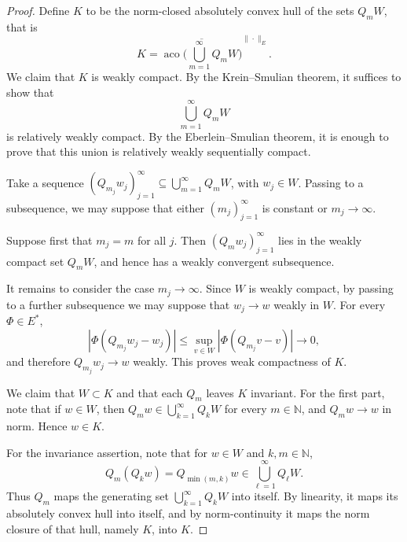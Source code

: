 \documentclass[11pt,reqno]{amsart}
\makeatletter
\theoremstyle{plain}
\theoremstyle{definition}
\newcounter{problempaper}
\newenvironment{problempaperbody}{%
  \setcounter{subsection}{0}%
  \setcounter{subsubsection}{0}%
  \setcounter{paragraph}{0}%
  \renewcommand{\thesubsection}{\arabic{subsection}}%
  \renewcommand{\thesubsubsection}{\thesubsection.\arabic{subsubsection}}%
  \renewcommand{\theparagraph}{\thesubsubsection.\arabic{paragraph}}%
  \let\problem@outersection\section
  \let\problem@outersubsection\subsection
  \let\problem@outersubsubsection\subsubsection
  \let\problem@outerparagraph\paragraph
  \let\section\problem@papersection
  \let\subsection\problem@papersubsection
  \let\subsubsection\problem@papersubsubsection
}{%
  \let\section\problem@outersection
  \let\subsection\problem@outersubsection
  \let\subsubsection\problem@outersubsubsection
  \let\paragraph\problem@outerparagraph
}
\newcommand{\problem@target}[2]{%
  \hypertarget{problem-\theproblempaper-#1-#2}{}%
}
\newcommand{\problem@paperheading}[3]{%
  \par\bigskip
  \problem@target{#1}{#2}%
  \noindent{\large\bfseries #2.\quad #3\par}%
  \nobreak\smallskip
}
\newcommand{\problem@papersubheading}[3]{%
  \par\medskip
  \problem@target{#1}{#2}%
  \noindent{\normalsize\bfseries #2.\quad #3\par}%
  \nobreak\smallskip
}
\newcommand{\problem@papersubsubheading}[3]{%
  \par\smallskip
  \problem@target{#1}{#2}%
  \noindent{\normalsize\itshape #2.\quad #3.\ }%
}
\def\problem@papersection{%
  \@ifstar{\problem@papersectionstar}{\problem@papersectionnostar}%
}
\def\problem@papersectionstar#1{%
  \par\bigskip\noindent{\large\bfseries #1\par}\nobreak\smallskip
}
\def\problem@papersectionnostar#1{%
  \refstepcounter{subsection}%
  \setcounter{subsubsection}{0}%
  \setcounter{paragraph}{0}%
  \problem@paperheading{section}{\thesubsection}{#1}%
  \problem@writecontentsline{section}{\thesubsection}{#1}%
}
\def\problem@papersubsection{%
  \@ifstar{\problem@papersubsectionstar}{\problem@papersubsectionnostar}%
}
\def\problem@papersubsectionstar#1{%
  \par\medskip\noindent{\normalsize\bfseries #1\par}\nobreak\smallskip
}
\def\problem@papersubsectionnostar#1{%
  \refstepcounter{subsubsection}%
  \setcounter{paragraph}{0}%
  \problem@papersubheading{subsection}{\thesubsubsection}{#1}%
  \problem@writecontentsline{subsection}{\thesubsubsection}{#1}%
}
\def\problem@papersubsubsection{%
  \@ifstar{\problem@papersubsubsectionstar}{\problem@papersubsubsectionnostar}%
}
\def\problem@papersubsubsectionstar#1{%
  \par\smallskip\noindent{\normalsize\itshape #1.\ }%
}
\def\problem@papersubsubsectionnostar#1{%
  \refstepcounter{paragraph}%
  \problem@papersubsubheading{subsubsection}{\theparagraph}{#1}%
  \problem@writecontentsline{subsubsection}{\theparagraph}{#1}%
}
\newcommand{\problem@writecontentsline}[3]{%
  \begingroup
  \protected@write\@auxout{}{%
    \string\problemcontentsentry{\theproblempaper}{#1}{#2}{#3}{\thepage}%
  }%
  \endgroup
}
\newcommand{\problemcontentsentry}[5]{%
  \@ifundefined{problemcontents@#1}{%
    \expandafter\gdef\csname problemcontents@#1\endcsname{}%
  }{}%
  \expandafter\g@addto@macro\csname problemcontents@#1\endcsname{%
    \problemcontentsline{#1}{#2}{#3}{#4}{#5}%
  }%
}
\newcommand{\problemcontentslink}[4]{%
  \hyperlink{problem-#1-#2-#3}{#4}%
}
\newcommand{\problemcontentsline}[5]{%
  \ifstrequal{#2}{section}{%
    \par\noindent
    \problemcontentslink{#1}{#2}{#3}{\makebox[2.5em][l]{#3}#4}%
    \nobreak\dotfill
    \problemcontentslink{#1}{#2}{#3}{#5}\par
  }{%
    \ifstrequal{#2}{subsection}{%
      \par\noindent\hspace*{1.5em}%
      \problemcontentslink{#1}{#2}{#3}{\makebox[3.5em][l]{#3}#4}%
      \nobreak\dotfill
      \problemcontentslink{#1}{#2}{#3}{#5}\par
    }{%
      \par\noindent\hspace*{3em}%
      \problemcontentslink{#1}{#2}{#3}{\makebox[4.5em][l]{#3}#4}%
      \nobreak\dotfill
      \problemcontentslink{#1}{#2}{#3}{#5}\par
    }%
  }%
}
\makeatother
\begin{document}
\begin{problempaperbody}
\begin{proof}
Define $K$ to be the norm-closed absolutely convex hull of the sets $Q_mW$, that is
\begin{equation*}
        K=\overline{\operatorname{aco}\bigl(\bigcup_{m=1}^{\infty}Q_mW\bigr)}^{\|\cdot\|_E}.
\end{equation*}
We claim that $K$ is weakly compact. By the Krein--Smulian theorem, it suffices to show that
\begin{equation*}
        \bigcup_{m=1}^{\infty}Q_mW
\end{equation*}
is relatively weakly compact. By the Eberlein--Smulian theorem, it is enough to prove that this union is relatively weakly sequentially compact.

Take a sequence $(Q_{m_j}w_j)_{j=1}^{\infty}\subseteq \bigcup_{m=1}^{\infty}Q_mW$, with $w_j\in W$. Passing to a subsequence, we may suppose that either $(m_j)_{j=1}^{\infty}$ is constant or $m_j\to\infty$.

Suppose first that $m_j=m$ for all $j$. Then $(Q_mw_j)_{j=1}^{\infty}$ lies in the weakly compact set $Q_mW$, and hence has a weakly convergent subsequence.

It remains to consider the case $m_j\to\infty$. Since $W$ is weakly compact, by passing to a further subsequence we may suppose that $w_j\to w$ weakly in $W$. For every $\Phi\in E^*$,
\begin{equation*}
        |\Phi(Q_{m_j}w_j-w_j)|\leq \sup_{v\in W}|\Phi(Q_{m_j}v-v)|\to0,
\end{equation*}
and therefore $Q_{m_j}w_j\to w$ weakly. This proves weak compactness of $K$.

We claim that $W\subset K$ and that each $Q_m$ leaves $K$ invariant. For the first part, note that if $w\in W$, then $Q_mw\in \bigcup_{k=1}^{\infty}Q_kW$ for every $m\in\mathbb N$, and $Q_mw\to w$ in norm. Hence $w\in K$.

For the invariance assertion, note that for $w\in W$ and $k,m\in\mathbb N$,
\begin{equation*}
        Q_m(Q_kw)=Q_{\min(m,k)}w\in \bigcup_{\ell=1}^{\infty}Q_\ell W.
\end{equation*}
Thus $Q_m$ maps the generating set $\bigcup_{k=1}^{\infty}Q_kW$ into itself. By linearity, it maps its absolutely convex hull into itself, and by norm-continuity it maps the norm closure of that hull, namely $K$, into $K$.


\end{proof}
\end{problempaperbody}
\end{document}
